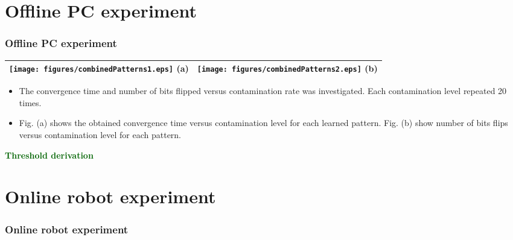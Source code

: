 \documentclass{beamer}
\begin{document}
\section{Offline PC experiment}

\begin{frame}
\frametitle{Offline PC experiment}
\begin{center}

\begin{tabular}{|@{}l|@{}l|}
  \hline
  
 \texttt{[image: figures/combinedPatterns1.eps]} (a)
& \texttt{[image: figures/combinedPatterns2.eps]} (b)\\ \hline

  \hline
\end{tabular}

\end{center}

\begin{itemize}\scriptsize
\item The convergence time and number of bits flipped versus contamination rate 
was investigated. Each contamination level repeated 20 times.
\item Fig. (a) shows the obtained convergence time versus contamination level 
for each learned pattern. Fig. (b) show number of bits flips versus contamination 
level for each pattern.
\end{itemize}

\begin{block}{}\scriptsize
\centering \textcolor{darkgreen}{\textbf{Threshold derivation}}

\end{block}

\end{frame}

\section{Online robot experiment}

\begin{frame}
\frametitle{Online robot experiment}
\begin{center}
\end{center}

\end{frame}
\end{document}
